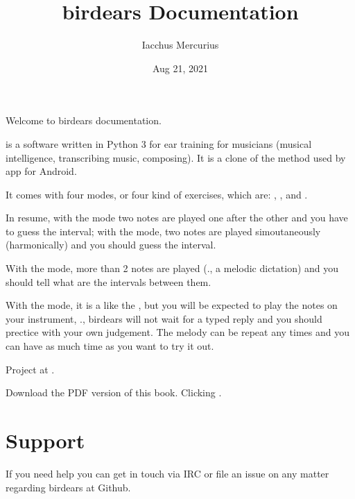 \documentclass[letterpaper,10pt,english]{sphinxmanual}
\title{birdears Documentation}
\date{Aug 21, 2021}
\author{Iacchus Mercurius}
\begin{document}
\pagestyle{empty}
\sphinxmaketitle
\pagestyle{plain}
\sphinxtableofcontents
\pagestyle{normal}
\label{\detokenize{index::doc}}


\sphinxAtStartPar
Welcome to birdears documentation.

\sphinxAtStartPar
{} is a software written in Python 3 for ear training for
musicians (musical intelligence, transcribing music, composing). It is a
clone of the method used by 
app for Android.

\sphinxAtStartPar
It comes with four modes, or four kind of exercises, which are:
, ,  and .

\sphinxAtStartPar
In resume, with the  mode two notes are played one after the
other and you have to guess the interval; with the  mode,
two notes are played simoutaneously (harmonically) and you should guess
the interval.

\sphinxAtStartPar
With the  mode, more than 2 notes are played (., a
melodic dictation) and you should tell what are the intervals between
them.

\sphinxAtStartPar
With the  mode, it is a like the , but you will
be expected to play the notes on your instrument, ., birdears will
not wait for a typed reply and you should prectice with your own
judgement. The melody can be repeat any times and you can have as much
time as you want to try it out.

\sphinxAtStartPar
Project at .

\sphinxAtStartPar
Download the PDF version of this book. Clicking .




\chapter{Support}
\label{\detokenize{community:support}}\label{\detokenize{community::doc}}
\sphinxAtStartPar
If you need help you can get in touch via IRC or file an issue on any matter regarding birdears at Github.
\end{document}

